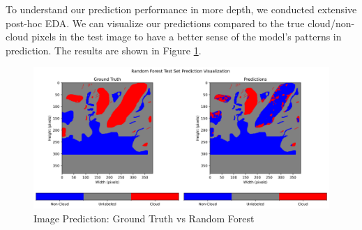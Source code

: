 \documentclass[10pt,letterpaper]{article}
\begin{document}







To understand our prediction performance in more depth, we conducted extensive post-hoc EDA. We can visualize our predictions compared to the true cloud/non-cloud pixels in the test image to have a better sense of the model's patterns in prediction. The results are shown in Figure \ref{fig:prediction_plot}.

\begin{figure}[ht]
    \centering
    \includegraphics[width=0.75\linewidth]{figs/pred_plot.png}
    \caption{Image Prediction: Ground Truth vs Random Forest}
    \label{fig:prediction_plot}
\end{figure}
\end{document}
